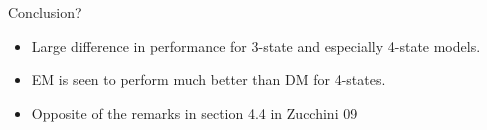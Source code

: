\begin{frame}{Conclusion?}
    \begin{itemize}
        \item Large difference in performance for 3-state and especially 4-state models.
        \item EM is seen to perform much better than DM for 4-states.
        \item Opposite of the remarks in section 4.4 in Zucchini 09
    \end{itemize}
\end{frame}





